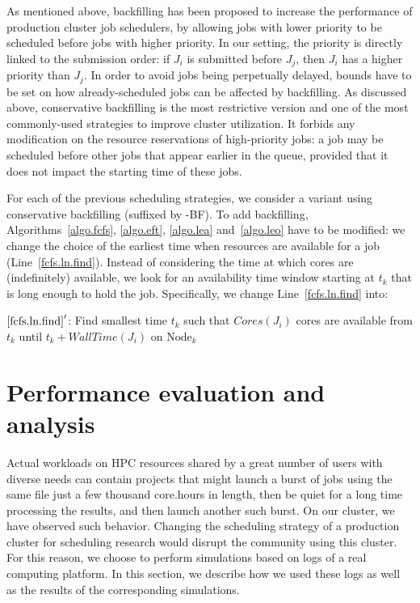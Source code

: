 \documentclass[conference]{IEEEtran}
\newcommand{\Node}[1]{\ensuremath{\mathrm{Node}_{#1}}\xspace}
\newcommand{\core}{\mathit{Cores}\xspace}
\newcommand{\walltime}{\mathit{WallTime}\xspace}
\begin{document}
As mentioned above, backfilling has been proposed to increase the
performance of production cluster job schedulers, by allowing jobs with lower priority to be
scheduled before jobs with higher priority. In our setting, the
priority is directly linked to the submission order: if $J_i$ is
submitted before $J_j$, then $J_i$ has a higher priority than $J_j$.
In order to avoid jobs
being perpetually delayed, bounds have to be set on how already-scheduled
jobs can be affected by backfilling. As discussed above,
conservative backfilling is the most restrictive version and one of
the most commonly-used strategies to improve cluster utilization. It
forbids any modification on the resource
reservations of high-priority jobs: a job may be scheduled
before other jobs that appear earlier in the queue, provided that it
does not impact the starting time of these jobs.


For each of the previous scheduling strategies, we consider a variant
using conservative backfilling (suffixed by -BF). To add
backfilling, Algorithms~\ref{algo.fcfs}, \ref{algo.eft},
\ref{algo.lea} and~\ref{algo.leo} have to be modified: we change the
choice of the earliest time when resources are available for a job
(Line~\ref{fcfs.ln.find}). Instead of considering the time at which
cores are (indefinitely) available, we look for an availability time
window starting at $t_k$ that is long enough to hold the
job. Specifically, we change Line~\ref{fcfs.ln.find} into:
\begin{algorithmic}[0]
  \State $\ref{fcfs.ln.find}'$: Find smallest time $t_k$ such that $\core(J_i)$ cores are
  available from $t_k$ until $t_k + \walltime(J_i)$ on $\Node{k}$
\end{algorithmic}


\section{Performance evaluation and analysis}\label{sec.evaluations}

Actual workloads on HPC resources shared by a great number of users with diverse needs can contain 
projects that might launch a burst of jobs using the same file just a few thousand
core.hours in length, then be quiet for a long time processing the results, and then launch another such burst.
On our cluster, we have observed such behavior. %
Changing the scheduling strategy of a production cluster for
scheduling research would disrupt the community using this cluster.
For this reason, we choose to perform simulations based on logs of a
real computing platform. In this section, we describe how we used
these logs as well as the results of the corresponding simulations.
\end{document}
